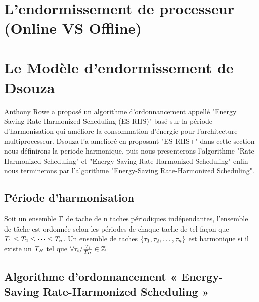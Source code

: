 \section{L'endormissement de processeur (Online VS Offline)}
\vspace{-1cm}
\section{Le Modèle d'endormissement de Dsouza}
\vspace{-1cm}
Anthony Rowe a proposé un algorithme d’ordonnancement appellé "Energy Saving Rate Harmonized Scheduling (ES RHS)" \cite{Rowe10} basé sur la période d’harmonisation qui améliore la consommation d’énergie pour l’architecture multiprocesseur.
Dsouza l'a amelioré en proposant "ES RHS+" dans cette section nous définirons la periode harmonique, puis nous presenterons l'algorithme "Rate Harmonized Scheduling" et "Energy Saving Rate-Harmonized Scheduling" enfin nous terminerons par l'algorithme "Energy-Saving Rate-Harmonized Scheduling".

\subsection{Période d’harmonisation}

Soit un ensemble $\Gamma$ de tache de n taches périodiques indépendantes, l’ensemble de tâche est ordonnée selon les périodes de chaque tache de tel façon que $T_{1} \leq T_{2} \leq \dots \leq T_{n}$. 
Un ensemble de taches $\{\tau_{1}, \tau_{2}, \dots, \tau_{n} \}$ est harmonique si il existe un $T_{H}$ tel que $\forall \tau_{i} / \frac{T_{i}}{T_{H}} \in \mathbb{Z}$

\subsection{Algorithme d’ordonnancement « Energy-Saving Rate-Harmonized Scheduling »}

